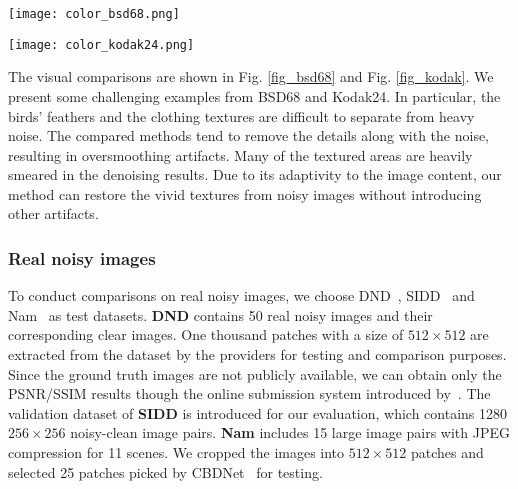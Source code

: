 \documentclass[runningheads]{llncs}
\begin{document}
\begin{figure*}
\begin{center}
\texttt{[image: color\_bsd68.png]}
\end{center}
\setlength{\abovecaptionskip}{0.cm}
   \caption{Synthetic image denoising results on BSD68 with noise level $\sigma=50$.}
\label{fig_bsd68}
\end{figure*}

\begin{figure*}
\begin{center}
\texttt{[image: color\_kodak24.png]}
\end{center}
\setlength{\abovecaptionskip}{0.cm}
   \caption{Synthetic image denoising results on Kodak24 with noise level $\sigma=50$.}
\label{fig_kodak}
\end{figure*}

The visual comparisons are shown in Fig. \ref{fig_bsd68} and Fig. \ref{fig_kodak}. We present some challenging examples from BSD68 and Kodak24. In particular, the birds' feathers and the clothing textures are difficult to separate from heavy noise. The compared methods tend to remove the details along with the noise, resulting in oversmoothing artifacts. Many of the textured areas are heavily smeared in the denoising results. Due to its adaptivity to the image content, our method can restore the vivid textures from noisy images without introducing other artifacts.

\subsubsection{Real noisy images}

To conduct comparisons on real noisy images, we choose DND~\cite{plotz2017benchmarking}, SIDD~\cite{abdelhamed2018high} and Nam~\cite{nam2016holistic} as test datasets. \textbf{DND} contains 50 real noisy images and their corresponding clear images. One thousand patches with a size of $512\times 512$ are extracted from the dataset by the providers for testing and comparison purposes. Since the ground truth images are not publicly available, we can  obtain only the PSNR/SSIM results though the online submission system introduced by~\cite{plotz2017benchmarking}. The validation dataset of \textbf{SIDD} is introduced for our evaluation, which contains 1280 $256\times 256$ noisy-clean image pairs. \textbf{Nam} includes 15 large image pairs with JPEG compression for 11 scenes. We cropped the images into $512\times 512$ patches and selected 25 patches picked by CBDNet~\cite{guo2019toward} for testing. 
\end{document}
